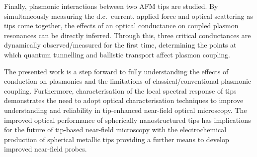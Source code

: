\documentclass[12pt, a4paper, oneside]{book}
\begin{document}
Finally, plasmonic interactions between two AFM tips are studied. By simultaneously measuring the d.c.\ current, applied force and optical scattering as tips come together, the effects of an optical conductance on coupled plasmon resonances can be directly inferred. Through this, three critical conductances are dynamically observed/measured for the first time, determining the points at which quantum tunnelling and ballistic transport affect plasmon coupling.

The presented work is a step forward to fully understanding the effects of conduction on plasmonics and the limitations of classical/conventional plasmonic coupling. Furthermore, characterisation of the local spectral response of tips demonstrates the need to adopt optical characterisation techniques to improve understanding and reliability in tip-enhanced near-field optical microscopy. The improved optical performance of spherically nanostructured tips has implications for the future of tip-based near-field microscopy with the electrochemical production of spherical metallic tips providing a further means to develop improved near-field probes.
\end{document}
